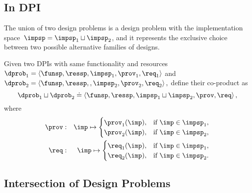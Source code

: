 \subsection{In DPI}\label{subsec:dpi-union}


The union of two design problems is a design problem with the implementation
space~$\impsp=\impsp_{1}\sqcup\impsp_{2}$, and it represents the
exclusive choice between two possible alternative families of designs.
\begin{definition}[Co-product]
  \label{def:parallel-1}Given two DPIs with same functionality and
  resources $\dprob_{1}=\left\langle \funsp,\ressp,\impsp_{1},\prov_{1},\req_{1}\right\rangle $
  and $\dprob_{2}=\left\langle \funsp,\ressp,,\impsp_{2},\prov_{2},\req_{2}\right\rangle ,$
  define their co-product as
  \[
    \dprob_{1}\sqcup\dprob_{2}\doteq\left\langle \funsp,\ressp,\impsp_{1}\sqcup\impsp_{2},\prov,\req\right\rangle ,
  \]
  where
  \begin{eqnarray}
    \prov & : & \imp\mapsto\begin{cases}
                             \prov_{1}(\imp), & \text{if }\imp\in\impsp_{1},\\
                             \prov_{2}(\imp), & \text{if }\imp\in\impsp_{2},
    \end{cases}\label{eq:dppar-exec-1}\\
    \req & : & \imp\mapsto\begin{cases}
                            \req_{1}(\imp), & \text{if }\imp\in\impsp_{1},\\
                            \req_{2}(\imp), & \text{if }\imp\in\impsp_{2}.
    \end{cases}\nonumber
  \end{eqnarray}
\end{definition}




\begin{figure}[h!]
    \centering
    \caption{\label{fig:dpcoproduct}}
\end{figure}

\subsection{Intersection of Design Problems}

